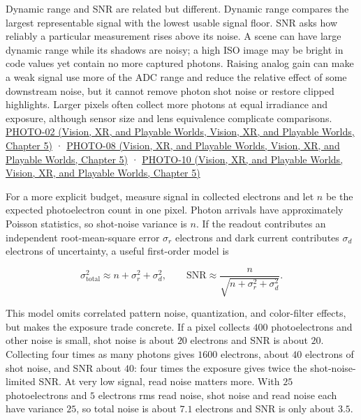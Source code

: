 Dynamic range and SNR are related but different. Dynamic range compares the largest representable signal with the lowest usable signal floor. SNR asks how reliably a particular measurement rises above its noise. A scene can have large dynamic range while its shadows are noisy; a high ISO image may be bright in code values yet contain no more captured photons. Raising analog gain can make a weak signal use more of the ADC range and reduce the relative effect of some downstream noise, but it cannot remove photon shot noise or restore clipped highlights. Larger pixels often collect more photons at equal irradiance and exposure, although sensor size and lens equivalence complicate comparisons. \href{../07-Vision-XR-and-Playable-Worlds/main.pdf\#nameddest=04-visual-computing-ii-ch036-photo-02---photography-session-02}{PHOTO-02 (Vision, XR, and Playable Worlds, Vision, XR, and Playable Worlds, Chapter 5)} · \href{../07-Vision-XR-and-Playable-Worlds/main.pdf\#nameddest=04-visual-computing-ii-ch036-photo-08---photography-session-08}{PHOTO-08 (Vision, XR, and Playable Worlds, Vision, XR, and Playable Worlds, Chapter 5)} · \href{../07-Vision-XR-and-Playable-Worlds/main.pdf\#nameddest=04-visual-computing-ii-ch036-photo-10---photography-session-10}{PHOTO-10 (Vision, XR, and Playable Worlds, Vision, XR, and Playable Worlds, Chapter 5)}

For a more explicit budget, measure signal in collected electrons and let \(n\) be the expected photoelectron count in one pixel. Photon arrivals have approximately Poisson statistics, so shot-noise variance is \(n\). If the readout contributes an independent root-mean-square error \(\sigma_r\) electrons and dark current contributes \(\sigma_d\) electrons of uncertainty, a useful first-order model is

\[
\sigma_{\mathrm{total}}^2\approx n+\sigma_r^2+\sigma_d^2,
\qquad
\mathrm{SNR}\approx\frac{n}{\sqrt{n+\sigma_r^2+\sigma_d^2}}.
\]

This model omits correlated pattern noise, quantization, and color-filter effects, but makes the exposure trade concrete. If a pixel collects \(400\) photoelectrons and other noise is small, shot noise is about \(20\) electrons and SNR is about \(20\). Collecting four times as many photons gives \(1600\) electrons, about \(40\) electrons of shot noise, and SNR about \(40\): four times the exposure gives twice the shot-noise-limited SNR. At very low signal, read noise matters more. With \(25\) photoelectrons and \(5\) electrons rms read noise, shot noise and read noise each have variance \(25\), so total noise is about \(7.1\) electrons and SNR is only about \(3.5\).

